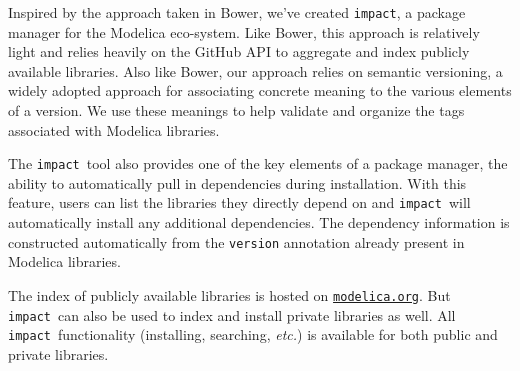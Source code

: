 \documentclass[11pt,a4paper,twocolumn]{article}
\newcommand{\impact}{\texttt{impact}} %
\newcommand{\code}[1]{\texttt{#1}} %
\begin{document}

Inspired by the approach taken in Bower, we've created \impact, a
package manager for the Modelica eco-system.  Like Bower, this
approach is relatively light and relies heavily on the GitHub API to
aggregate and index publicly available libraries.  Also like Bower,
our approach relies on semantic versioning, a widely adopted approach
for associating concrete meaning to the various elements of a version.
We use these meanings to help validate and organize the tags
associated with Modelica libraries.

The \impact\ tool also provides one of the key elements of a package
manager, the ability to automatically pull in dependencies during
installation.  With this feature, users can list the libraries they
directly depend on and \impact\ will automatically install any
additional dependencies.  The dependency information is constructed
automatically from the \code{version} annotation already present in
Modelica libraries.

The index of publicly available libraries is hosted on
\href{https://modelica.org}{\code{modelica.org}}.  But \impact\ can
also be used to index and install private libraries as well.  All
\impact\ functionality (installing, searching, \textit{etc.}) is
available for both public and private libraries.

\printbibliography
\end{document}
